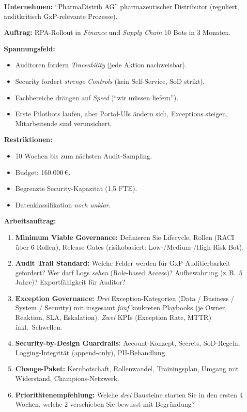 \documentclass[11pt,a4paper,oneside]{article}
\begin{document}
\begin{infobox}
\textbf{Unternehmen:} ``PharmaDistrib AG'' \textendash{} pharmazeutischer Distributor (reguliert, audit\-kritisch \textendash{} GxP-relevante Prozesse).

\smallskip
\textbf{Auftrag:} RPA-Rollout in \emph{Finance} und \emph{Supply Chain} \textendash{} 10 Bots in 3 Monaten.

\smallskip
\textbf{Spannungsfeld:}
\begin{itemize}
  \item Auditoren fordern \emph{Traceability} (jede Aktion nachweisbar).
  \item Security fordert \emph{strenge Controls} (kein Self-Service, SoD strikt).
  \item Fachbereiche dr\"angen auf \emph{Speed} (``wir m\"ussen liefern'').
  \item Erste Pilotbots laufen, aber Portal-UIs \"andern sich, Exceptions steigen, Mitarbeitende sind verunsichert.
\end{itemize}

\smallskip
\textbf{Restriktionen:}
\begin{itemize}
  \item 10 Wochen bis zum n\"achsten Audit-Sampling.
  \item Budget: 160.000\,\euro{}.
  \item Begrenzte Security-Kapazit\"at (1,5 FTE).
  \item Datenklassifikation \emph{noch unklar}.
\end{itemize}
\end{infobox}

\noindent\textbf{Arbeitsauftrag:}

\begin{enumerate}
  \item \textbf{Minimum Viable Governance:} Definieren Sie Lifecycle, Rollen (RACI \"uber 6 Rollen), Release Gates (risikobasiert: Low-/Medium-/High-Risk Bot).
  \item \textbf{Audit Trail Standard:} Welche Felder werden f\"ur GxP-Auditierbarkeit gefordert? Wer darf Logs \emph{sehen} (Role-based Access)? Aufbewahrung (z.\,B.\ 5 Jahre)? Exportf\"ahigkeit f\"ur Auditor?
  \item \textbf{Exception Governance:} \emph{Drei} Exception-Kategorien (Data / Business / System / Security) mit insgesamt \emph{f\"unf} konkreten Playbooks (je Owner, Reaktion, SLA, Eskalation). \emph{Zwei} KPIs (Exception Rate, MTTR) inkl.\ Schwellen.
  \item \textbf{Security-by-Design Guardrails:} Account-Konzept, Secrets, SoD-Regeln, Logging-Integrit\"at (append-only), PII-Behandlung.
  \item \textbf{Change-Paket:} Kernbotschaft, Rollenwandel, Trainingsplan, Umgang mit Widerstand, Champions-Netzwerk.
  \item \textbf{Priorit\"atenempfehlung:} Welche \emph{drei} Bausteine starten Sie in den ersten 4 Wochen, welche 2 verschieben Sie bewusst \textendash{} mit Begr\"undung?
\end{enumerate}
\end{document}
